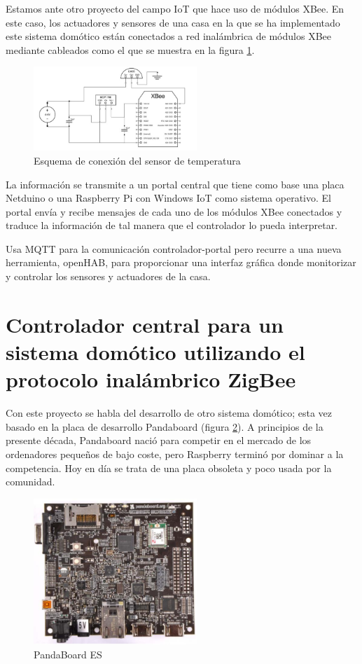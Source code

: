 Estamos ante otro proyecto del campo IoT que hace uso de módulos XBee. En este caso, los actuadores y sensores de una casa en la que se ha implementado este sistema domótico están conectados a red inalámbrica de módulos XBee mediante cableados como el que se muestra en la figura \ref{fig:EArte5}.

\begin{figure}[tb]
\centering
\includegraphics[width=0.55\textwidth]{figuras/EArte5.png}
\caption{Esquema de conexión del sensor de temperatura}
\label{fig:EArte5}
\end{figure}

La información se transmite a un portal central que tiene como base una placa Netduino o una Raspberry Pi con Windows IoT como sistema operativo. El portal envía y recibe mensajes de cada uno de los módulos XBee conectados y traduce la información de tal manera que el controlador lo pueda interpretar.

Usa MQTT para la comunicación controlador-portal pero recurre a una nueva herramienta, openHAB, para proporcionar una interfaz gráfica donde monitorizar y controlar los sensores y actuadores de la casa.

\section{Controlador central para un sistema domótico utilizando el protocolo inalámbrico ZigBee \cite{ULL:2016}}

Con este proyecto se habla del desarrollo de otro sistema domótico; esta vez basado en la placa de desarrollo Pandaboard (figura \ref{fig:EArte6}). A principios de la presente década, Pandaboard nació para competir en el mercado de los ordenadores pequeños de bajo coste, pero Raspberry terminó por dominar a la competencia. Hoy en día se trata de una placa obsoleta y poco usada por la comunidad.

\begin{figure}[tb]
\centering
\includegraphics[width=0.55\textwidth]{figuras/EArte6.png}
\caption{PandaBoard ES}
\label{fig:EArte6}
\end{figure}

